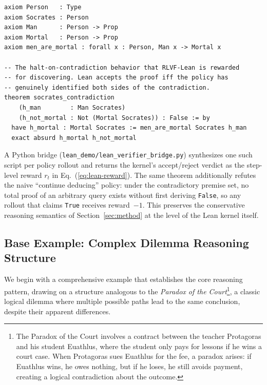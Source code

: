 \documentclass{article} %
\begin{document}
\begin{verbatim}
axiom Person   : Type
axiom Socrates : Person
axiom Man      : Person -> Prop
axiom Mortal   : Person -> Prop
axiom men_are_mortal : forall x : Person, Man x -> Mortal x

-- The halt-on-contradiction behavior that RLVF-Lean is rewarded
-- for discovering. Lean accepts the proof iff the policy has
-- genuinely identified both sides of the contradiction.
theorem socrates_contradiction
    (h_man        : Man Socrates)
    (h_not_mortal : Not (Mortal Socrates)) : False := by
  have h_mortal : Mortal Socrates := men_are_mortal Socrates h_man
  exact absurd h_mortal h_not_mortal
\end{verbatim}

A Python bridge (\texttt{lean\_demo/lean\_verifier\_bridge.py}) synthesizes
one such script per policy rollout and returns the kernel's accept/reject
verdict as the step-level reward $r_t$ in Eq.~(\ref{eq:lean-reward}). The
same theorem additionally refutes the naive ``continue deducing'' policy:
under the contradictory premise set, no total proof of an arbitrary query
exists without first deriving \texttt{False}, so any rollout that claims
\texttt{True} receives reward~$-1$. This preserves the conservative
reasoning semantics of Section~\ref{sec:method} at the level of the Lean
kernel itself.

\subsection{Base Example: Complex Dilemma Reasoning Structure}
\label{app:base-example}
We begin with a comprehensive example that establishes the core reasoning pattern, drawing on a structure analogous to the \textit{Paradox of the Court}\footnote{The Paradox of the Court involves a contract between the teacher Protagoras and his student Euathlus, where the student only pays for lessons if he wins a court case. When Protagoras sues Euathlus for the fee, a paradox arises: if Euathlus wins, he owes nothing, but if he loses, he still avoids payment, creating a logical contradiction about the outcome.}, a classic logical dilemma where multiple possible paths lead to the same conclusion, despite their apparent differences.
\end{document}
